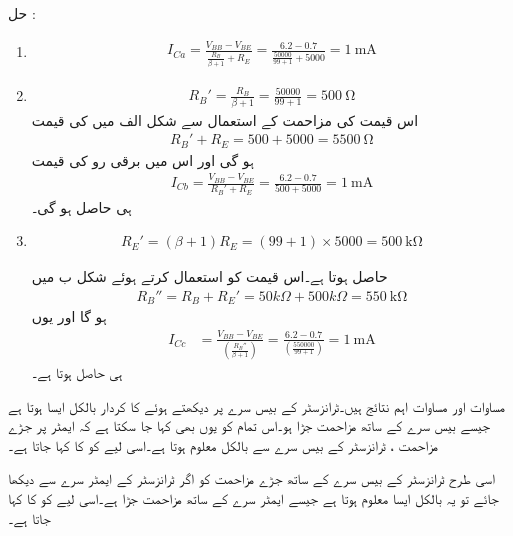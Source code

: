 حل :
\begin{enumerate}
\item
\begin{align*}
I_{Ca}=\frac{V_{BB}-V_{BE}}{\frac{R_B}{\beta+1}+R_E}=\frac{6.2-0.7}{\frac{50000}{99+1}+5000} =\SI{1}{\milli \ampere}
\end{align*}
\item
\begin{align*}
R_B'=\frac{R_B}{\beta+1}=\frac{50000}{99+1}=\SI{500}{\ohm}
\end{align*}
اس قیمت کی مزاحمت کے استعمال سے شکل  الف میں   کی قیمت 
\begin{align*}
R_B'+R_E=500+5000=\SI{5500}{\ohm} 
\end{align*} 
 ہو گی اور اس میں برقی رو کی قیمت
\begin{align*}
I_{Cb}=\frac{V_{BB}-V_{BE}}{R_B'+R_E}=\frac{6.2-0.7}{500+5000}=\SI{1}{\milli \ampere}
\end{align*}
ہی حاصل ہو گی۔

\item
\begin{align*}
R_E'=(\beta+1)R_E =(99+1) \times 5000=\SI{500}{\kilo \ohm}
\end{align*}

حاصل ہوتا ہے۔اس قیمت  کو استعمال کرتے ہوئے شکل  ب میں
\begin{align*}
R_B''=R_B+R_E'=50 k \Omega +500k \Omega = \SI{550}{\kilo \ohm} 
\end{align*}
 ہو گا اور یوں
\begin{align*}
I_{Cc}&=\frac{V_{BB}-V_{BE}}{\left (\frac{R_B''}{\beta+1} \right )}=\frac{6.2-0.7}{\left (\frac{550000}{99+1} \right )}=\SI{1}{\milli \ampere}
\end{align*}
ہی حاصل ہوتا ہے۔
\end{enumerate}




مساوات   اور مساوات   اہم نتائج ہیں۔ٹرانزسٹر کے بیس سرے پر دیکھتے ہوئے  کا کردار بالکل ایسا ہوتا ہے جیسے بیس سرے کے ساتھ مزاحمت  جڑا ہو۔اس تمام کو یوں بھی کہا جا سکتا ہے کہ ایمٹر پر جڑے مزاحمت  ، ٹرانزسٹر کے بیس سرے سے بالکل   معلوم ہوتا ہے۔اسی لیے  کو  کا  کہا جاتا ہے۔

اسی طرح ٹرانزسٹر کے بیس سرے کے ساتھ جڑے مزاحمت  کو اگر ٹرانزسٹر کے ایمٹر سرے سے دیکھا جائے تو یہ بالکل ایسا معلوم ہوتا ہے جیسے  ایمٹر سرے کے ساتھ مزاحمت  جڑا ہے۔اسی لیے  کو  کا  کہا جاتا ہے۔

